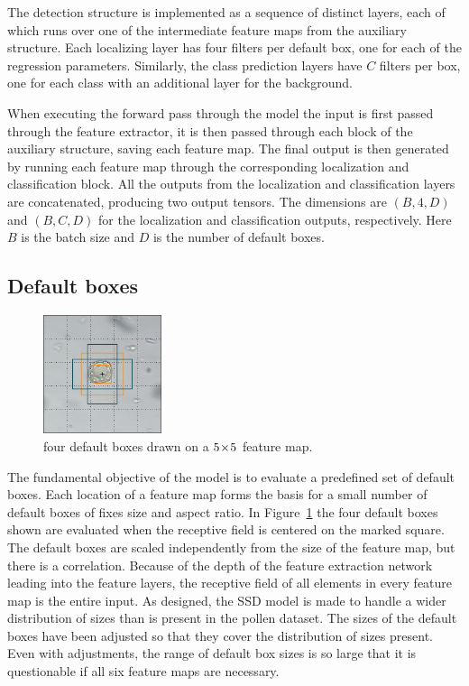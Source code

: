 The detection structure is implemented as a sequence of distinct layers, each of which runs over one of the intermediate feature maps from the auxiliary structure.
Each localizing layer has four filters per default box, one for each of the regression parameters.
Similarly, the class prediction layers have \(C\) filters per box, one for each class with an additional layer for the background.

When executing the forward pass through the model the input is first passed through the feature extractor, it is then passed through each block of the auxiliary structure, saving each feature map.
The final output is then generated by running each feature map through the corresponding localization and classification block.
All the outputs from the localization and classification layers are concatenated, producing two output tensors.
The dimensions are \(\left(B,4,D\right) \) and \(\left(B,C,D\right) \) for the localization and classification outputs, respectively.
Here \(B\) is the batch size and \(D\) is the number of default boxes.

\subsection{Default boxes}

\begin{figure}
  \centering
  \includegraphics[width=0.31\textwidth]{figs/method/default_boxes.png}
  \caption[Visualizing default boxes]{four default boxes drawn on a \(5\!\times \! 5 \) feature map.}\label{fig:defaults}
\end{figure}

The fundamental objective of the model is to evaluate a predefined set of default boxes.
Each location of a feature map forms the basis for a small number of default boxes of fixes size and aspect ratio.
In Figure~\ref{fig:defaults} the four default boxes shown are evaluated when the receptive field is centered on the marked square.
The default boxes are scaled independently from the size of the feature map, but there is a correlation.
Because of the depth of the feature extraction network leading into the feature layers, the receptive field of all elements in every feature map is the entire input. As designed, the SSD model is made to handle a wider distribution of sizes than is present in the pollen dataset.
The sizes of the default boxes have been adjusted so that they cover the distribution of sizes present.
Even with adjustments, the range of default box sizes is so large that it is questionable if all six feature maps are necessary.

